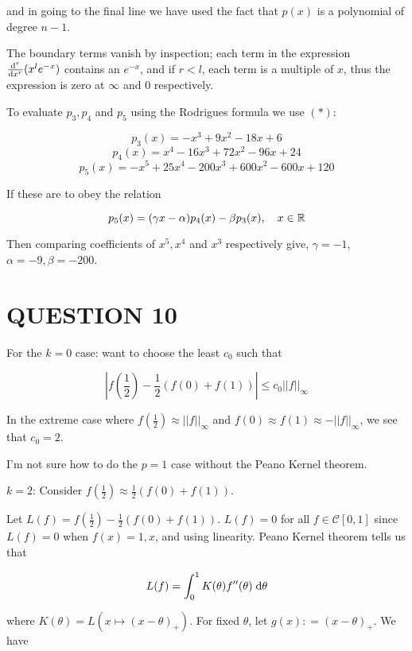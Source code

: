 \documentclass[a4paper]{article}
\begin{document}
and in going to the final line we have used the fact that $ p(x) $ is a polynomial of degree $ n-1 $. 

The boundary terms vanish by inspection; each term in the expression $ \frac{\mathrm{d}^{r} }{\mathrm{d} x^{r}}(x^{l}e^{-x}) $ contains an $ e^{-x} $, and if $ r < l $, each term is a multiple of $ x $, thus the expression is zero at $ \infty $ and $ 0 $ respectively. 

To evaluate $ p_{3},p_{4} $ and $ p_{5} $ using the Rodrigues formula we use $ (*) $:

\[ p_{3}(x) = - x^{3} + 9x^{2} - 18 x + 6 \]
\[ p_{4}(x) = x^{4} -  16 x^{3} + 72 x^{2} - 96 x + 24 \]
\[ p_{5}(x) =  - x^{5} + 25 x^{4} - 200 x^{3} + 600 x^{2} - 600 x + 120 \]

If these are to obey the relation

\[ p_{5}(x) = (\gamma x - \alpha)p_{4}(x) - \beta p_{3}(x), \quad x \in \mathbb{R} \]

Then comparing coefficients of $ x^{5},x^{4}$ and $ x^{3} $ respectively give,  $ \gamma = -1 $, $ \alpha = -9, \beta = -200 $.


\section{QUESTION 10}

For the $ k = 0 $ case: want to choose the least $ c_{0}$ such that

\[ \left| f(\frac{1}{2}) - \frac{1}{2} \left(  f(0) + f(1)  \right)  \right|  \leq c_{0} | | f | |_{\infty}  \]


In the extreme case where $ f(\frac{1}{2}) \approx  | | f | |_{\infty}   $ and $ f(0) \approx f(1) \approx -  | | f | |_{\infty}  $, we see that $ c_{0} = 2 $.

I'm not sure how to do the $ p = 1 $ case without the Peano Kernel theorem. 






$ k = 2 $: Consider $ f(\frac{1}{2}) \approx \frac{1}{2} (   f(0) + f(1 )) $.




Let $ L(f) = f(\frac{1}{2}) - \frac{1}{2} (   f(0) + f(1 ))  $. $ L(f) = 0 $ for all $ f \in \mathcal{C}[0,1] $ since $ L(f) = 0 $ when $ f(x) = 1,x $, and using linearity. Peano Kernel theorem tells us that 

\[ L(f) = \int_{0}^{1} K(\theta) f''(\theta) \; \mathrm{d} \theta   \]


where $ K(\theta) = L(   x \mapsto (x-\theta)_{+} ) $. For fixed $ \theta $,  let $ g(x) : = (x-\theta)_{+} $. We have
\end{document}

